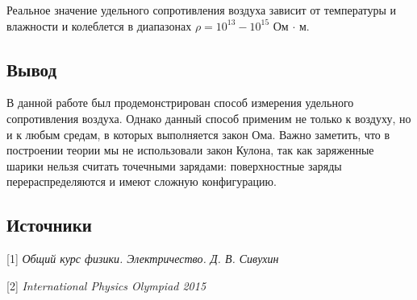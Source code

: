 \documentclass[a4paper, 12pt]{article}
\begin{document}
Реальное значение удельного сопротивления воздуха зависит  от температуры и влажности и колеблется в диапазонах $\rho = 10^{13} - 10^{15}$ Ом $\cdot$ м. 

\subsection*{Вывод}

В данной работе был продемонстрирован способ измерения удельного сопротивления воздуха. Однако данный способ применим не только к воздуху, но и к любым средам, в которых выполняется закон Ома. Важно заметить, что в построении теории мы не использовали закон Кулона, так как заряженные шарики нельзя считать точечными зарядами: поверхностные заряды перераспределяются и имеют сложную конфигурацию. 

\subsection*{Источники}

[1] \textit{Общий курс физики. Электричество. Д. В. Сивухин} 

[2] \textit{International Physics Olympiad 2015}
\end{document}
